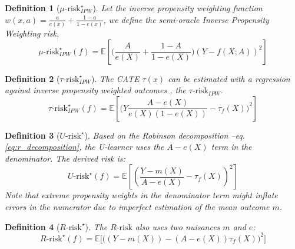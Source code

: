 \documentclass[french,12pt,twoside,a4paper]{book}
\newtheorem{definition}{Definition}
\begin{document}
\begin{definition}[$\mu\text{-risk}_{IPW}^{\star}$]\label{def:mu_ipw_risk}
  \citep{vanderlaan_unified_2003} Let the inverse propensity weighting
  function $w(x, a) = \frac{a}{e(x)} + \frac{1 - a}{1 - e(x)}$, we define the
  semi-oracle Inverse Propensity Weighting risk,
  \begin{equation*}\label{eq:mu_ipw_risk}
    \mu\text{-risk}_{IPW}^{\star}(f) = \mathbb{E}\left[ \Big( \frac{A}{e(X)} + \frac{1-A}{1-e(X)} \Big) (Y-f(X ; A))^2 \right]
  \end{equation*}
\end{definition}

\smallskip


\begin{definition}[$\tau\text{-risk}^{\star}_{IPW}$]\label{def:tau_ipw_risk}
  \citep{wager_estimation_2018}
  The CATE $\tau(x)$ can be estimated with a
  regression against inverse propensity weighted outcomes \citep{
    athey2016recursive,gutierrez_causal_2016,wager_estimation_2018},
  the $\tau\text{-risk}_{IPW}$.
  \begin{equation*}
    \tau\text{-risk}^{\star}_{IPW}(f) =\mathbb{E}
    \left[ \Big(Y \frac{A - e(X)}{e(X)
        (1-e(X))}-\tau_f\left(X\right)\Big)^2 \right]
  \end{equation*}
\end{definition}

\begin{definition}[$U\text{-risk}^{\star}$]\label{def:u_risk}
  \citep{kunzel_metalearners_2019,nie_quasioracle_2017} Based on
  the Robinson decomposition --eq. \ref{eq:r_decomposition}, the U-learner
  uses the $A-e(X)$ term
  in the denominator. The derived risk is:
  \begin{equation*}
    U\text{-risk}^{\star}(f) =\mathbb{E}
    \left[
      \left( \frac{Y-m\left(X\right)}{A-e\left(X\right)} -
      \tau_f\left(X\right)\right)^{2} \right]
  \end{equation*}
  Note that extreme propensity weights in the
  denominator term might inflate errors in the numerator due to imperfect
  estimation of the mean outcome $m$.
\end{definition}

\begin{definition}[$R\text{-risk}^{\star}$]\label{def:r_risk}
  \citep{nie_quasioracle_2017,schuler_comparison_2018}
  The $R\text{-risk}$ also uses two nuisances $m$ and $e$:
  \begin{equation*}
    R\text{-risk}^{\star}(f) =\mathbb{E} \big[
      \big(\left(Y-m\left(X\right)\right) -\left(A-e\left(X\right)\right) \tau_f\left(X\right)\big)^{2} \big]
  \end{equation*}
\end{definition}
\end{document}
